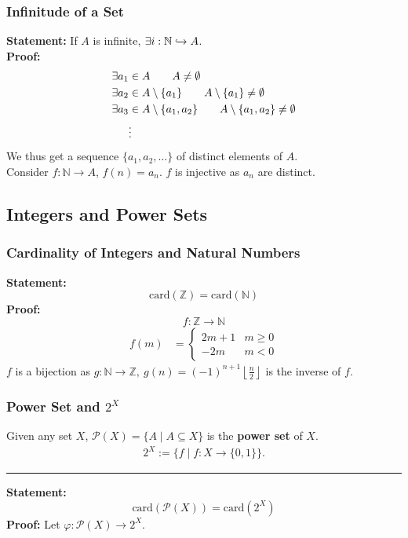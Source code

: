 \documentclass[10pt]{extarticle}
\begin{document}
      \subsubsection{Infinitude of a Set}%
      \textbf{Statement:} If $A$ is infinite, $\exists i: \mathbb{N} \xhookrightarrow{} A$.\\

      \textbf{Proof:}
      \begin{align*}
        \exists a_1&\in A \tag*{$A\neq \emptyset$}\\
        \exists a_2 &\in A\setminus \{a_1\} \tag*{$A\setminus \{a_1\} \neq \emptyset$}\\
        \exists a_3&\in A\setminus \{a_1,a_2\} \tag*{$A \setminus \{a_1,a_2\} \neq \emptyset$}\\
                   &\vdots
      \end{align*}
      We thus get a sequence $\{a_1,a_2,\dots\}$ of distinct elements of $A$.\\

      Consider $f:\mathbb{N} \rightarrow A$, $f(n) = a_n$. $f$ is injective as $a_n$ are distinct.\\
    \subsection{Integers and Power Sets}%
    \subsubsection{Cardinality of Integers and Natural Numbers}%
    \textbf{Statement:}
      \[
        \text{card}(\mathbb{Z}) = \text{card}(\mathbb{N})
      \] 
      \textbf{Proof:}
      \[
        f:\mathbb{Z} \rightarrow \mathbb{N}
      \] 
      \begin{align*}
        f(m) &= \begin{cases}
          2m + 1 & m\geq 0\\
          -2m & m<0
        \end{cases}
      \end{align*}
      $f$ is a bijection as $g:\mathbb{N} \rightarrow \mathbb{Z},~g(n) = (-1)^{n+1}\left\lfloor \frac{n}{2}\right\rfloor$ is the inverse of $f$.\\
      \subsubsection{Power Set and $2^{X}$}%
      Given any set $X$, $\mathcal{P}(X) = \{A \mid A\subseteq X\}$ is the \textbf{power set} of $X$.
      \begin{align*}
        2^X:= \{f\mid f:X\rightarrow \{0,1\}\}.
      \end{align*}
      \begin{center}
        \rule{0.5\textwidth}{0.4pt}
      \end{center}
      \textbf{Statement:}
      \[
        \text{card}(\mathcal{P}(X)) = \text{card}(2^X)
      \] 
      \textbf{Proof:} Let $\varphi: \mathcal{P}(X) \rightarrow 2^X$.\\
\end{document}
